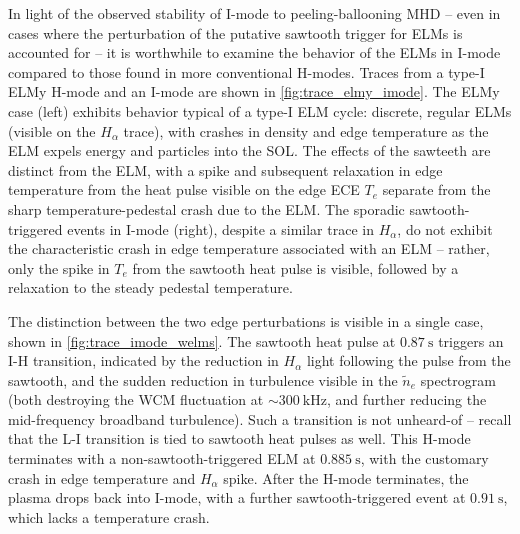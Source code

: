In light of the observed stability of I-mode to peeling-ballooning MHD -- even in cases where the perturbation of the putative sawtooth trigger for ELMs is accounted for -- it is worthwhile to examine the behavior of the ELMs in I-mode compared to those found in more conventional H-modes.  Traces from a type-I ELMy H-mode and an I-mode are shown in \cref{fig:trace_elmy_imode}.  The ELMy case (left) exhibits behavior typical of a type-I ELM cycle: discrete, regular ELMs (visible on the $H_\alpha$ trace), with crashes in density and edge temperature as the ELM expels energy and particles into the SOL.  The effects of the sawteeth are distinct from the ELM, with a spike and subsequent relaxation in edge temperature from the heat pulse visible on the edge ECE $T_e$ separate from the sharp temperature-pedestal crash due to the ELM.  The sporadic sawtooth-triggered events in I-mode (right), despite a similar trace in $H_\alpha$, do not exhibit the characteristic crash in edge temperature associated with an ELM -- rather, only the spike in $T_e$ from the sawtooth heat pulse is visible, followed by a relaxation to the steady pedestal temperature.

The distinction between the two edge perturbations is visible in a single case, shown in \cref{fig:trace_imode_welms}.  The sawtooth heat pulse at $\SI{0.87}{\second}$ triggers an I-H transition, indicated by the reduction in $H_\alpha$ light following the pulse from the sawtooth, and the sudden reduction in turbulence visible in the $\tilde{n}_e$ spectrogram (both destroying the WCM fluctuation at $\sim \SI{300}{\kilo\hertz}$, and further reducing the mid-frequency broadband turbulence).  Such a transition is not unheard-of -- recall that the L-I transition is tied to sawtooth heat pulses as well.  This H-mode terminates with a non-sawtooth-triggered ELM at $\SI{0.885}{\second}$, with the customary crash in edge temperature and $H_\alpha$ spike.  After the H-mode terminates, the plasma drops back into I-mode, with a further sawtooth-triggered event at $\SI{0.91}{\second}$, which lacks a temperature crash.


